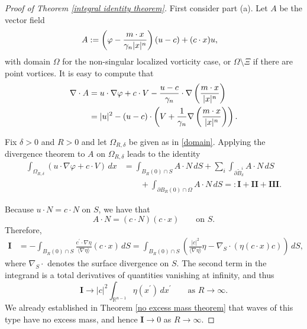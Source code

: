 \documentclass[11pt,reqno]{amsart}
\newcommand{\jbracket}[1]{\langle{#1}\rangle}
\newcommand{\R}{\mathbb{R}}
\theoremstyle{plain}
\theoremstyle{remark}
\numberwithin{equation}{section}
\begin{document}
\begin{proof}[Proof of Theorem \ref{integral identity theorem}] 
First consider part (a).  Let $A$ be the vector field 
\begin{equation}
 \label{AV def} 
 \begin{split} 
   A &:= \left( \varphi - {m \cdot x\over \gamma_n |x|^n} \right) (u-c) + (c \cdot x) u,
 \end{split} 
\end{equation}
with domain $\Omega$ for the non-singular localized vorticity case, or $\Omega \setminus \Xi$ if there are point vortices. It is easy to compute that
\begin{equation}
  \label{first dipole: div A_V} \begin{split}
    \nabla \cdot A & = u \cdot \nabla \varphi + c \cdot V - {u - c \over \gamma_n} \cdot \nabla\left( {m \cdot x \over |x|^n} \right) \\
    & = |u|^2 - (u-c) \cdot \left( V +  {1 \over \gamma_n } \nabla\left( {m \cdot x \over |x|^n} \right) \right).  
  \end{split} 
\end{equation}

Fix $\delta > 0$ and $R > 0$ and let $\Omega_{R, \delta}$ be given as in \eqref{domain}.  Applying the divergence theorem to $A$ on $\Omega_{R,\delta}$ leads to the identity
\begin{align*}
\int_{\Omega_{R,\delta}} \left( u \cdot \nabla \varphi + c \cdot V \right) \, dx & = \int_{B_R(0) \cap S} A \cdot N \, dS +  \sum_i \int_{\partial \tilde B^i_\delta} A \cdot N \, dS \\
& \qquad + \int_{\partial B_R(0) \cap \Omega} A \cdot N \, dS =: \mathbf{I} + \mathbf{II} + \mathbf{III}.
\end{align*}

Because $u \cdot N = c \cdot N$ on $S$, we have that 
\begin{equation}
  \label{first dipole: I vanishes} 
  A \cdot N= (c \cdot N)(c \cdot x) \qquad \textrm{on } S. 
\end{equation} 
Therefore, 
\begin{align*} \mathbf{I} & = -\int_{B_R(0) \cap S} \frac{c^\prime \cdot \nabla \eta}{\jbracket{\nabla \eta}} (c \cdot x) \, dS  = \int_{B_R(0) \cap S} \left( \frac{|c|^2}{\jbracket{\nabla \eta}} \eta - \nabla_S \cdot \left( \eta (c \cdot x) c\right) \right) \, dS,
\end{align*} 
where $\nabla_S \cdot$ denotes the surface divergence on $S$.  The second term in the integrand is a total derivatives of quantities vanishing at infinity, and thus
\[ \mathbf{I} \to |c|^2 \int_{\R^{n-1}} \eta(x^\prime) \, dx^\prime \qquad \textrm{as } R \to \infty.\]
We already established in Theorem \ref{no excess mass theorem} that waves of this type have no excess mass, and hence $\mathbf{I} \to 0$ as $R \to \infty$.


\end{proof}
\end{document}
